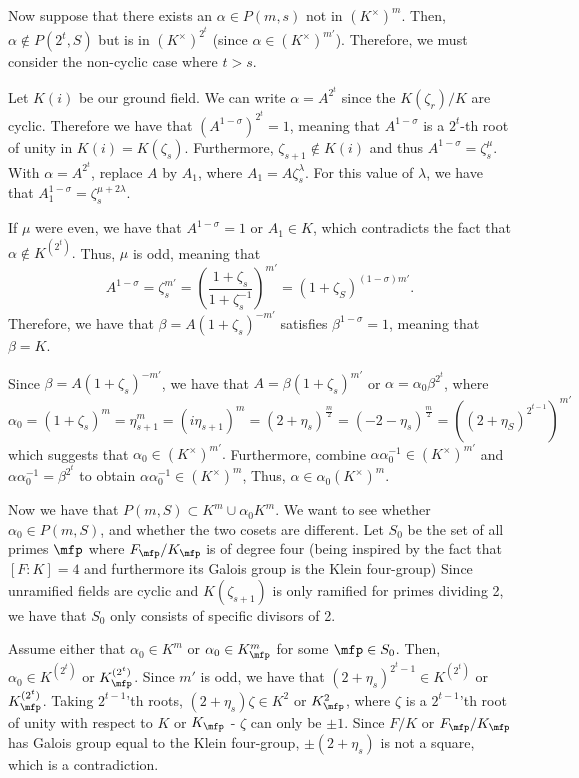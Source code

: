 \documentclass[a4paper, 12pt,oneside,openany]{book}
\begin{document}
Now suppose that there exists an $\alpha \in P(m, s)$ not in $(K^\times)^m$. Then, $\alpha \not\in P(2^t, S)$ but is in $(K^\times)^{2^t}$ (since $\alpha \in (K^\times)^{m'}$). Therefore, we must consider the non-cyclic case where $t>s$.

Let $K(i)$ be our ground field. We can write $\alpha = A^{2^t}$ since the $K(\zeta_r)/K$ are cyclic. Therefore we have that $(A^{1-\sigma})^{2^t}=1$, meaning that $A^{1-\sigma}$ is a $2^t$-th root of unity in $K(i) = K(\zeta_s)$. Furthermore, $\zeta_{s+1} \not\in K(i)$ and thus $A^{1-\sigma} = \zeta_s^\mu$. With $\alpha = A^{2^t}$, replace $A$ by $A_1$, where $A_1 = A\zeta_s^\lambda$. For this value of $\lambda$, we have that $A_1^{1-\sigma} = \zeta_s^{\mu+2\lambda}$. 

If $\mu$ were even, we have that $A^{1-\sigma}=1$ or $A_1 \in K$, which contradicts the fact that $\alpha \not\in K^{(2^t)}.$ Thus, $\mu$ is odd, meaning that $$A^{1-\sigma} =\zeta_s^{m'} = \left(\frac{1+\zeta_s}{1+\zeta_s^{-1}}\right)^{m'} = (1+\zeta_S)^{(1-\sigma)m'}.$$ Therefore, we have that $\beta = A(1+\zeta_s)^{-m'}$ satisfies $\beta^{1-\sigma}=1$, meaning that $\beta = K$. 

Since $\beta = A(1+\zeta_s)^{-m'}$, we have that $A=\beta(1+\zeta_s)^{m'}$ or $\alpha = \alpha_0 \beta^{2^t}$, where $$\alpha_0 = (1+\zeta_s)^m = \eta_{s+1}^m = (i\eta_{s+1})^m = (2+\eta_s)^{\frac{m}{2}} = (-2-\eta_s)^{\frac{m}{2}} = ((2+\eta_S)^{2^{t-1}})^{m'}$$ which suggests that $\alpha_0 \in (K^\times)^{m'}.$ Furthermore, combine $\alpha \alpha_0^{-1} \in (K^\times)^{m'}$ and $\alpha \alpha_0^{-1} = \beta^{2^t}$ to obtain $\alpha \alpha_0^{-1} \in (K^\times)^m$, Thus, $\alpha \in \alpha_0 (K^\times)^m.$

Now we have that $P(m, S) \subset K^m \cup \alpha_0K^m$. We want to see whether $\alpha_0 \in P(m, S)$, and whether the two cosets are different. Let $S_0$ be the set of all primes $\mfp$ where $F_\mfp/K_\mfp$ is of degree four (being inspired by the fact that $[F:K]=4$ and furthermore its Galois group is the Klein four-group) Since unramified fields are cyclic and $K(\zeta_{s+1})$ is only ramified for primes dividing 2, we have that $S_0$ only consists of specific divisors of 2.

Assume either that $\alpha_0 \in K^m$ or $\alpha_0 \in K_\mfp^m$ for some $\mfp \in S_0$. Then, $\alpha_0 \in K^{(2^t)}$ or $K_\mfp^{(2^t)}$. Since $m'$ is odd, we have that $(2+\eta_s)^{2^t-1} \in K^{(2^t)}$ or $K_\mfp^{(2^t)}$. Taking $2^{t-1}$'th roots, $(2+\eta_s)\zeta \in K^2$ or $K^2_\mfp$, where $\zeta$ is a $2^{t-1}$'th root of unity with respect to $K$ or $K_\mfp$ - $\zeta$ can only be $\pm 1$. Since $F/K$ or $F_\mfp/K_\mfp$ has Galois group equal to the Klein four-group, $\pm(2+\eta_s)$ is not a square, which is a contradiction.
\end{document}
